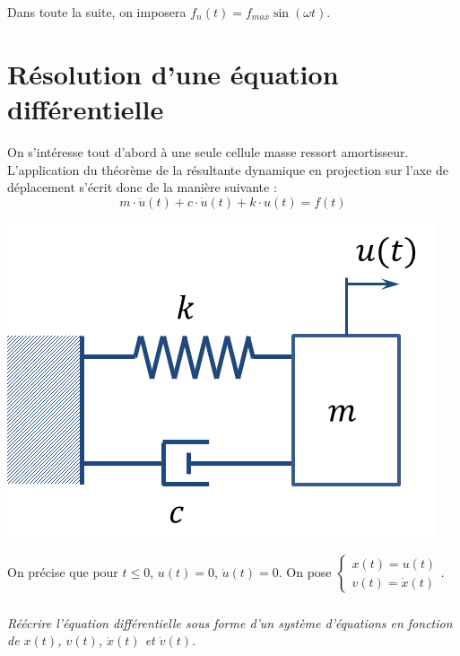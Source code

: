 \documentclass[10pt]{article}
\newif\ifprof
\begin{document}
Dans toute la suite, on imposera $f_n(t)=f_{max} \sin \left(\omega t\right)$.
\fi

\section{Résolution d'une équation différentielle}
\ifprof
\else

\begin{minipage}[c]{.6\linewidth}
On s'intéresse tout d'abord à une seule cellule masse ressort amortisseur. L'application du théorème de la résultante dynamique en projection sur l'axe de déplacement s'écrit donc 
de la manière suivante : 
$$
m\cdot\ddot{u}(t)+c\cdot \dot{u}(t) + k\cdot u(t) = f(t)
$$
\end{minipage}\hfill
\begin{minipage}[c]{.37\linewidth}
\begin{center}
\includegraphics[width=.95\textwidth]{images/cellule}
\end{center}
\end{minipage}

On précise que pour $t\leq 0$, $u(t)=0$, $\dot{u}(t)=0$. On pose  $\left\{ \begin{array}{l} x(t) = u(t) \\ v(t) = \dot{x}(t)\end{array} \right.$.


\fi
\subparagraph{}
\textit{Réécrire l'équation différentielle sous forme d'un système d'équations en fonction de $x(t)$,  $v(t)$, $\dot{x}(t)$ et $\dot{v}(t)$.}
\ifprof
\begin{corrige}
On a donc : 
$$
\left\{ 
\begin{array}{l} 
v(t) = \dot{x}(t) \\ 
m\cdot\dot{v}(t)+c\cdot {v}(t) + k\cdot x(t) = f(t)
\end{array} \right.
$$
\end{corrige}
\else
\fi
\end{document}
